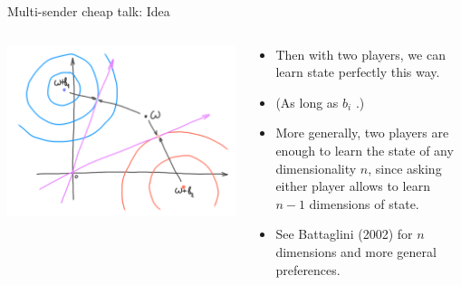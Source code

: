 \documentclass[english,10pt
,aspectratio=169
]{beamer}
\begin{document}
\begin{frame}{Multi-sender cheap talk: Idea}
	\begin{columns}
		\begin{column}{0.5\textwidth}
			\begin{center}
				\includegraphics[scale=0.65]{pics/M4/battaglini03.png}
			\end{center}
		\end{column}
		\begin{column}{0.5\textwidth}
			{\small
				\begin{itemize}
					\item Then with two players, we can learn state perfectly this way.
					\item (As long as $b_i$ .)
					\item More generally, two players are enough to learn the state of any dimensionality $n$, since asking either player allows to learn $n-1$ dimensions of state.
					\item See Battaglini (2002) for $n$ dimensions and more general preferences.
				\end{itemize}
			}
		\end{column}
	\end{columns}
\end{frame}
\end{document}
